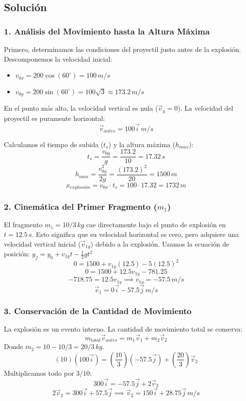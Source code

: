 \documentclass[12pt, a4paper]{article}
\begin{document}
\subsection*{Solución}

\subsubsection*{1. Análisis del Movimiento hasta la Altura Máxima}
Primero, determinamos las condiciones del proyectil justo antes de la explosión. Descomponemos la velocidad inicial:
\begin{itemize}
    \item $v_{0x} = 200 \cos(60^\circ) = 100 \, \si{m/s}$
    \item $v_{0y} = 200 \sin(60^\circ) = 100\sqrt{3} \approx 173.2 \, \si{m/s}$
\end{itemize}

En el punto más alto, la velocidad vertical es nula ($\vec{v}_y = 0$). La velocidad del proyectil es puramente horizontal:
\[ \vec{v}_{antes} = 100 \vec{i} \, \si{m/s} \]

Calculamos el tiempo de subida ($t_s$) y la altura máxima ($h_{max}$):
\[ t_s = \frac{v_{0y}}{g} = \frac{173.2}{10} = 17.32 \, \si{s} \]
\[ h_{max} = \frac{v_{0y}^2}{2g} = \frac{(173.2)^2}{20} = 1500 \, \si{m} \]
\[ x_{explosión} = v_{0x} \cdot t_s = 100 \cdot 17.32 = 1732 \, \si{m} \]

\subsubsection*{2. Cinemática del Primer Fragmento ($m_1$)}
El fragmento $m_1 = 10/3 \, \si{kg}$ cae directamente bajo el punto de explosión en $t = 12.5 \, \si{s}$. Esto significa que su velocidad horizontal es cero, pero adquiere una velocidad vertical inicial ($\vec{v}_{1y}$) debido a la explosión.
Usamos la ecuación de posición: $y_f = y_0 + v_{1y}t - \frac{1}{2}gt^2$
\[ 0 = 1500 + v_{1y}(12.5) - 5(12.5)^2 \]
\[ 0 = 1500 + 12.5 v_{1y} - 781.25 \]
\[ -718.75 = 12.5 v_{1y} \implies v_{1y} = -57.5 \, \si{m/s} \]
\[ \vec{v}_1 = 0 \vec{i} - 57.5 \vec{j} \, \si{m/s} \]

\subsubsection*{3. Conservación de la Cantidad de Movimiento}
La explosión es un evento interno. La cantidad de movimiento total se conserva:
\[ m_{total} \vec{v}_{antes} = m_1 \vec{v}_1 + m_2 \vec{v}_2 \]
Donde $m_2 = 10 - 10/3 = 20/3 \, \si{kg}$.
\[ (10)(100 \vec{i}) = \left(\frac{10}{3}\right)(-57.5 \vec{j}) + \left(\frac{20}{3}\right) \vec{v}_2 \]
Multiplicamos todo por $3/10$:
\[ 300 \vec{i} = -57.5 \vec{j} + 2 \vec{v}_2 \]
\[ 2 \vec{v}_2 = 300 \vec{i} + 57.5 \vec{j} \implies \vec{v}_2 = 150 \vec{i} + 28.75 \vec{j} \, \si{m/s} \]
\end{document}
